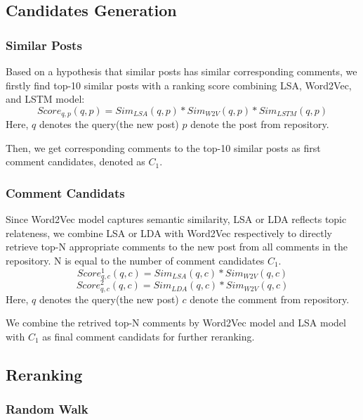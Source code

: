 \documentclass{llncs}
\begin{document}
\subsection{Candidates Generation}

\subsubsection{Similar Posts}
Based on a hypothesis that similar posts has similar corresponding comments, we firstly find top-10 similar posts with a ranking score combining LSA, Word2Vec, and LSTM model:
\begin{equation}
   Score_{q,p}(q, p) = Sim_{LSA}(q, p) * Sim_{W2V}(q, p) * Sim_{LSTM}(q, p)
\end{equation}
Here, $q$ denotes the query(the new post) $p$ denote the post from repository.

Then, we get corresponding comments to the top-10 similar posts as first comment candidates, denoted as $C_1$.

\subsubsection{Comment Candidats}
Since Word2Vec model captures semantic similarity, LSA or LDA reflects topic relateness, we combine LSA or LDA with Word2Vec respectively to directly retrieve top-N appropriate comments to the new post from all comments in the repository. N is equal to the number of comment candidates $C_1$. 
\begin{equation}
   Score_{q,c}^1(q, c) = Sim_{LSA}(q, c) * Sim_{W2V}(q, c)
\end{equation}
\begin{equation}
   Score_{q,c}^2(q, c) = Sim_{LDA}(q, c) * Sim_{W2V}(q, c)
\end{equation}
Here, $q$ denotes the query(the new post) $c$ denote the comment from repository.

We combine the retrived top-N comments by Word2Vec model and LSA model with $C_1$ as final comment candidats for further reranking.

\subsection{Reranking}

\subsubsection{Random Walk}
\end{document}
